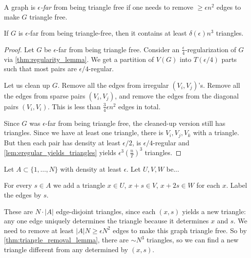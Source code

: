 \begin{definition}
A graph is \emph{$\epsilon$-far} from being triangle free if one needs to remove $\geq \epsilon n^2$ edges to make $G$ triangle free.
\end{definition}
\begin{theorem} \label{thm:triangle_removal_lemma}
If $G$ is $\epsilon$-far from being triangle-free, then it contains at least $\delta( \epsilon)n^3$ triangles.
\end{theorem}
\begin{proof}	
Let $G$ be $\epsilon$-far from being triangle free. Consider an $\frac{\epsilon}{4}$-regularization of $G$ via \cref{thm:regularity_lemma}. We get a partition of $V(G)$ into $T(\epsilon/4)$ parts such that most pairs are $\epsilon/4$-regular.

Let us clean up $G$. Remove all the edges from irregular $(V_i,V_j)$'s. Remove all the edges from sparse pairs $(V_i,V_j)$, and remove the edges from the diagonal pairs $(V_i,V_i)$. This is less than $\frac{3}{4}\epsilon n^2$  edges in total.

Since $G$ was $\epsilon$-far from being triangle free, the cleaned-up version still has triangles. Since we have at least one triangle, there is $V_i,V_j,V_k$ with a triangle. But then each pair has density at least $\epsilon/2$, is $\epsilon/4$-regular and \cref{lem:eregular_yields_triangles} yields $ \epsilon^3 \left( \frac{n}{T} \right)^3$ triangles.
\end{proof}



Let $A\subset \{1,\dotsc,N\}$ with density at least $\epsilon$. Let $U,V,W$ be...

For every $s\in A$ we add a triangle $x\in U$, $x+s \in V$, $x+2s\in W$ for each $x$. Label the edges by $s$.

These are $N\cdot |A|$ edge-disjoint triangles, since each $(x,s)$ yields a new triangle: any one edge uniquely determines the triangle because it determines $x$ and $s$. We need to remove at least $|A|N \geq \epsilon N^2$ edges to make this graph triangle free. So by \cref{thm:triangle_removal_lemma}, there are $\sim N^3$ triangles, so we can find a new triangle different from any determined by $(x,s)$.

